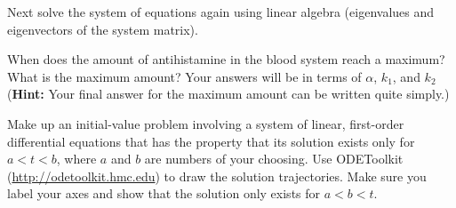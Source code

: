 \documentclass[boxes]{gsypset}
\begin{document}
\begin{problem}
\begin{subproblems}
\begin{solution}
				\end{solution}
			
			\subproblem
				Next solve the system of equations again using linear algebra 
				(eigenvalues and eigenvectors of the system matrix).
				\begin{solution}
					
				\end{solution}
			
			\subproblem 
				When does the amount of antihistamine in the blood system reach a maximum? 
				What is the maximum amount? 
				Your answers will be in terms of $\alpha$, $k_1$, and $k_2$ 
				(\textbf{Hint:} Your final answer for the maximum amount can be written quite simply.)
				\begin{solution}
					
				\end{solution}
		\end{subproblems}
	\end{problem}
	
	\begin{problem}
		Make up an initial-value problem involving a system of 
		linear, first-order differential equations that has the property that 
		its solution exists only for $a<t<b$, where $a$ and $b$ are numbers of your choosing. 
		Use ODEToolkit (\url{http://odetoolkit.hmc.edu}) to draw the solution trajectories. 
		Make sure you label your axes and show that the solution only exists for $a<b<t$.
	\end{problem}
	\begin{solution}
		
	\end{solution}
\end{document}
